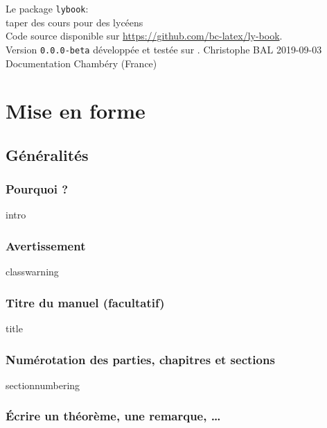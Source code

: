 \documentclass[14pt]{memoir}
\begin{document}
\buildfront
	{
		Le package \texttt{lybook}:
		\\
		taper des cours pour des lycéens
		\\
		{
			\footnotesize Code source disponible sur 
			\url{https://github.com/bc-latex/ly-book}.
		}
		\\
		{
			\footnotesize Version \texttt{0.0.0-beta} développée 
			et testée sur \macosxname{}.
		}
	}
	{Christophe BAL}
	{2019-09-03}
	{Documentation}
	{Chambéry (France)}



\part{Mise en forme}

\chapter{Généralités}

\section{Pourquoi ?}

{intro}




\section{Avertissement}

{classwarning}




\section{Titre du manuel (facultatif)}

{title}




\section{Numérotation des parties, chapitres et sections}

{sectionnumbering}




\section{Écrire un théorème, une remarque, \dots}
\end{document}
